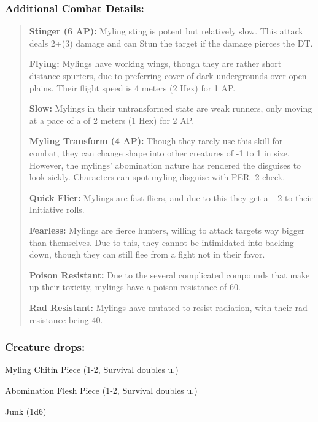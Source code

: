 \documentclass[11pt,a4paper,twocolumn]{book}
\begin{document}
	\subsubsection*{Additional Combat Details:}
	\begin{verse}
		\textbf{Stinger (6 AP):} Myling sting is potent but relatively slow. This attack deals 2+(3) damage and can Stun the target if the damage pierces the DT.
		
		\textbf{Flying:} Mylings have working wings, though they are rather short distance spurters, due to preferring cover of dark undergrounds over open plains. Their flight speed is 4 meters (2 Hex) for 1 AP.
		
		\textbf{Slow:} Mylings in their untransformed state are weak runners, only moving at a pace of a of 2 meters (1 Hex) for 2 AP.
		
		\textbf{Myling Transform (4 AP):} Though they rarely use this skill for combat, they can change shape into other creatures of -1 to 1 in size. However, the mylings' abomination nature has rendered the disguises to look sickly. Characters can spot myling disguise with PER -2 check.
		
		\textbf{Quick Flier:} Mylings are fast fliers, and due to this they get a +2 to their Initiative rolls.
		
		\textbf{Fearless:} Mylings are fierce hunters, willing to attack targets way bigger than themselves. Due to this, they cannot be intimidated into backing down, though they can still flee from a fight not in their favor.
		
		\textbf{Poison Resistant:} Due to the several complicated compounds that make up their toxicity, mylings have a poison resistance of 60.
		
		\textbf{Rad Resistant:} Mylings have mutated to resist radiation, with their rad resistance being 40.
	\end{verse}
	
	\subsubsection*{Creature drops:}
	\begin{compactitem}
		\item Myling Chitin Piece (1-2, Survival doubles u.)
		\item Abomination Flesh Piece (1-2, Survival doubles u.)
		\item Junk (1d6)
	\end{compactitem}
	
\end{document}
